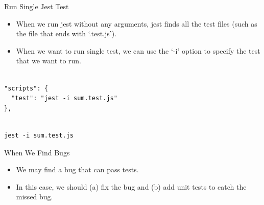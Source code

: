 \begin{frame}[fragile]{Run Single Jest Test}

\begin{itemize}
	\item When we run jest without any arguments, jest finds all the test files (such as the file that ends with `.test.js').
	\item When we want to run single test, we can use the `-i' option to specify the test that we want to run. 
\end{itemize}

\begin{Code}{}%
\begin{lstlisting}[firstnumber=1, label=glabels, xleftmargin=0pt, basicstyle=\scriptsize]% 

"scripts": {
  "test": "jest -i sum.test.js"
},
\end{lstlisting}%
\end{Code}%

\begin{Code}{}%
\begin{lstlisting}[firstnumber=1, label=glabels, xleftmargin=0pt, basicstyle=\scriptsize]% 

jest -i sum.test.js
\end{lstlisting}%
\end{Code}%

\end{frame}

\begin{frame}[fragile]{When We Find Bugs}

\begin{itemize}
	\item We may find a bug that can pass tests.
	\item In this case, we should (a) fix the bug and (b) add unit tests to catch the missed bug. 
\end{itemize}
\end{frame}